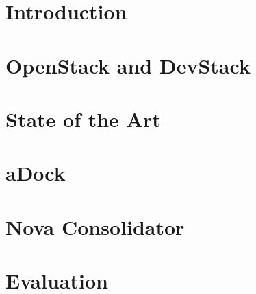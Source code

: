 \documentclass[12pt,a4paper,twoside,openright]{report}
\begin{document}

\setcounter{page}{1}

\chapter{Introduction}
\label{chap:intro}


\chapter{OpenStack and DevStack}
\label{chap:openstack_devstack}


\chapter{State of the Art}
\label{chap:sota}


\chapter{aDock}
\label{chap:adock}


\chapter{Nova Consolidator}
\label{chap:consolidator}


\chapter{Evaluation}
\label{chap:eval}

\end{document}
